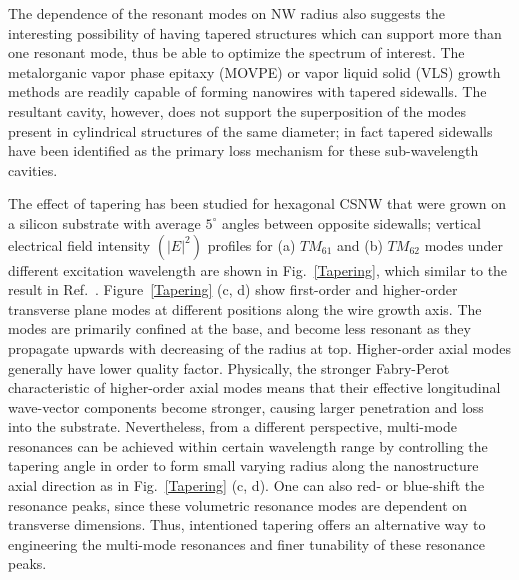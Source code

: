 The dependence of the resonant modes on NW radius also suggests the
interesting possibility of having tapered structures which can support more
than one resonant mode, thus be able to optimize the spectrum of interest. The
metalorganic vapor phase epitaxy (MOVPE) or vapor liquid solid (VLS) growth
methods are readily capable of forming nanowires with tapered sidewalls. The
resultant cavity, however, does not support the superposition of the modes
present in cylindrical structures of the same diameter; in fact tapered
sidewalls have been identified as the primary loss mechanism for these
sub-wavelength cavities.

The effect of tapering has been studied for hexagonal CSNW that were grown on a
silicon substrate with average $5^{\circ}$ angles between opposite sidewalls;
vertical electrical field intensity $({|E|}^2)$ profiles for (a) ${TM}_{61}$
and (b) ${TM}_{62}$ modes under different excitation wavelength are shown in
Fig.~\ref{Tapering}, which similar to the result in Ref.~\cite{Chen:2011cg}.
Figure~\ref{Tapering} (c, d) show first-order and higher-order transverse plane
modes at different positions along the wire growth axis. The modes are
primarily confined at the base, and become less resonant as they propagate
upwards with decreasing of the radius at top. Higher-order axial modes
generally have lower quality factor.  Physically, the stronger Fabry-Perot
characteristic of higher-order axial modes means that their effective
longitudinal wave-vector components become stronger, causing larger penetration
and loss into the substrate. Nevertheless, from a different perspective,
multi-mode resonances can be achieved within certain wavelength range by
controlling the tapering angle in order to form small varying radius along the
nanostructure axial direction as in Fig.~\ref{Tapering} (c, d). One can also
red- or blue-shift the resonance peaks, since these volumetric resonance modes
are dependent on transverse dimensions. Thus, intentioned tapering offers an
alternative way to engineering the multi-mode resonances and finer tunability
of these resonance peaks.

